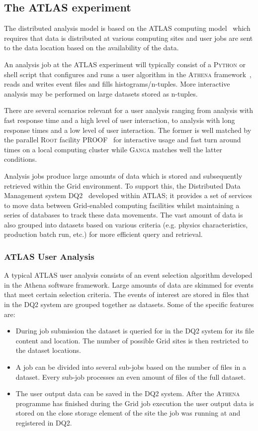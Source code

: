 \documentclass{elsart}
\def\atlas {ATLAS\xspace}
\def\ganga {\textsc{Ganga}\xspace}
\def\python {\textsc{Python}\xspace}
\def\root {\textsc{Root}\xspace}
\def\athena {\textsc{Athena}\xspace}
\def\grid {Grid\xspace}
\begin{document}
\subsection{The \atlas experiment}
\label{sec:atlas}
The distributed analysis model is based on the \atlas computing
model~\cite{bib:atlascompmod} which requires that data is distributed at
various computing sites and user jobs are sent to the data location based on
the availability of the data.

An analysis job at the \atlas experiment will typically consist of a \python
or shell script that configures and runs a user algorithm in the \athena
framework~\cite{bib:atlascompmod}, reads and writes event files and
fills histograms/n-tuples. More interactive analysis may be performed on
large datasets stored as n-tuples.

There are several scenarios relevant for a user analysis ranging from analysis
with fast response time and a high level of user interaction, to analysis with
long response times and a low level of user interaction. The former is well
matched by the parallel \root facility PROOF~\cite{ROOT} for interactive usage
and fast turn around times on a local computing cluster while \ganga matches
well the latter conditions.

Analysis jobs produce large amounts of data which is stored and subsequently
retrieved within the \grid environment. To support this, the Distributed Data
Management system DQ2~\cite{bib:atlasdq2} developed within \atlas; it provides
a set of services to move data between \grid-enabled computing facilities
whilst maintaining a series of databases to track these data movements.  The
vast amount of data is also grouped into datasets based on various criteria
(e.g.  physics characteristics, production batch run, etc.) for more efficient
query and retrieval.

\subsubsection{\atlas User Analysis}
A typical \atlas user analysis consists of an event selection algorithm
developed in the Athena software framework. Large amounts of data are skimmed
for events that meet certain selection criteria. The events of interest are
stored in files that in the DQ2 system are grouped together as datasets. Some
of the specific features are:
\begin{itemize}
\item During job submission the dataset is queried for in the DQ2 system for
  its file content and location.  The number of possible \grid sites is then
  restricted to the dataset locations.
\item A job can be divided into several sub-jobs based on the number of files
  in a dataset. Every sub-job processes an even amount of files of the full
  dataset.
\item The user output data can be saved in the DQ2 system. After the \athena
  programme has finished during the \grid job execution the user output data
  is stored on the close storage element of the site the job was running at
  and registered in DQ2.
\end{itemize}
\end{document}

